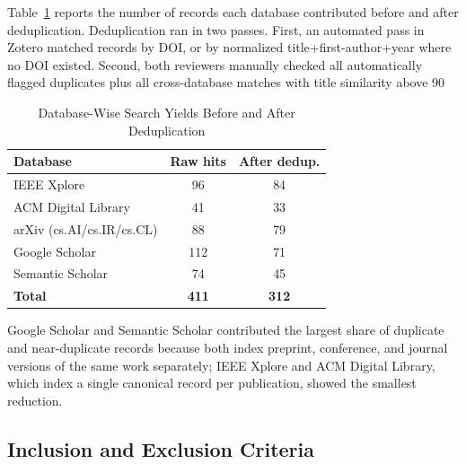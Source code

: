 \documentclass[sn-basic,Numbered]{sn-jnl}
\begin{document}
Table~\ref{tab:database_yields} reports the number of records each database contributed before and after deduplication. Deduplication ran in two passes. First, an automated pass in Zotero matched records by DOI, or by normalized title+first-author+year where no DOI existed. Second, both reviewers manually checked all automatically flagged duplicates plus all cross-database matches with title similarity above 90%

\begin{table}[h]
\centering
\caption{Database-Wise Search Yields Before and After Deduplication}
\label{tab:database_yields}
\renewcommand{\arraystretch}{1.15}
\begin{tabular}{|l|c|c|}
\hline
\textbf{Database} & \textbf{Raw hits} & \textbf{After dedup.} \\
\hline
IEEE Xplore & 96 & 84 \\
\hline
ACM Digital Library & 41 & 33 \\
\hline
arXiv (cs.AI/cs.IR/cs.CL) & 88 & 79 \\
\hline
Google Scholar & 112 & 71 \\
\hline
Semantic Scholar & 74 & 45 \\
\hline
\textbf{Total} & \textbf{411} & \textbf{312} \\
\hline
\end{tabular}
\end{table}

Google Scholar and Semantic Scholar contributed the largest share of
duplicate and near-duplicate records because both index preprint,
conference, and journal versions of the same work separately; IEEE
Xplore and ACM Digital Library, which index a single canonical record
per publication, showed the smallest reduction.

\subsection{Inclusion and Exclusion Criteria}
\end{document}
